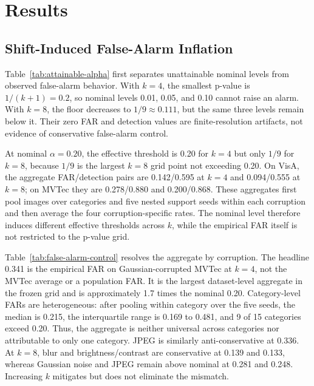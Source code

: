 \section{Results}\label{sec:results}

\subsection{Shift-Induced False-Alarm Inflation}\label{sec:target-only-operation}



Table~\ref{tab:attainable-alpha} first separates unattainable nominal levels from observed false-alarm behavior. With $k=4$, the smallest p-value is $1/(k+1)=0.2$, so nominal levels 0.01, 0.05, and 0.10 cannot raise an alarm. With $k=8$, the floor decreases to $1/9\approx0.111$, but the same three levels remain below it. Their zero FAR and detection values are finite-resolution artifacts, not evidence of conservative false-alarm control.

At nominal $\alpha=0.20$, the effective threshold is 0.20 for $k=4$ but only $1/9$ for $k=8$, because $1/9$ is the largest $k=8$ grid point not exceeding 0.20. On VisA, the aggregate FAR/detection pairs are 0.142/0.595 at $k=4$ and 0.094/0.555 at $k=8$; on MVTec they are 0.278/0.880 and 0.200/0.868. These aggregates first pool images over categories and five nested support seeds within each corruption and then average the four corruption-specific rates. The nominal level therefore induces different effective thresholds across $k$, while the empirical FAR itself is not restricted to the p-value grid.

Table~\ref{tab:false-alarm-control} resolves the aggregate by corruption. The headline 0.341 is the empirical FAR on Gaussian-corrupted MVTec at $k=4$, not the MVTec average or a population FAR. It is the largest dataset-level aggregate in the frozen grid and is approximately 1.7 times the nominal 0.20. Category-level FARs are heterogeneous: after pooling within category over the five seeds, the median is 0.215, the interquartile range is 0.169 to 0.481, and 9 of 15 categories exceed 0.20. Thus, the aggregate is neither universal across categories nor attributable to only one category. JPEG is similarly anti-conservative at 0.336. At $k=8$, blur and brightness/contrast are conservative at 0.139 and 0.133, whereas Gaussian noise and JPEG remain above nominal at 0.281 and 0.248. Increasing $k$ mitigates but does not eliminate the mismatch.


